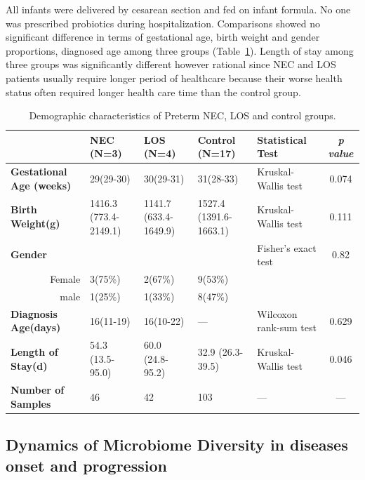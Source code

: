 \documentclass[fleqn,10pt, lineno]{wlpeerj} %
\begin{document}
  \noindent
   All infants were delivered by cesarean section and fed on infant formula. No one was prescribed probiotics during hospitalization. Comparisons showed no significant difference in terms of gestational age, birth weight and gender proportions, diagnosed age among three groups (Table~\ref{tab:demographic}). Length of stay among three groups was significantly different however rational since NEC and LOS patients usually require longer period of healthcare because their worse health status often required longer health care time than the control group.
    \begin{table}[!hpb]
       \centering
       \caption{\label{tab:demographic}Demographic characteristics of Preterm NEC, LOS and control groups.}
      \begin{tabular}{lp{1.8cm}p{1.8cm}p{1.8cm}p{2cm}c}
        \toprule
          & \textbf{NEC (N=3)} & \textbf{LOS (N=4)} & \textbf{Control (N=17)} & \textbf{Statistical Test} & \textit{p value} \\ \midrule
        \textbf{Gestational Age (weeks)} & 29(29-30) & 30(29-31) & 31(28-33) & Kruskal-Wallis test & 0.074 \\
        \textbf{Birth Weight(g)} & 1416.3 (773.4-2149.1) & 1141.7 (633.4-1649.9) & 1527.4 (1391.6-1663.1) & Kruskal-Wallis test & 0.111 \\
        \textbf{Gender} &  &  &  & Fisher's exact test & 0.82 \\
        \multicolumn{1}{r}{Female} & 3(75\%) & 2(67\%) & 9(53\%) &  & \\
        \multicolumn{1}{r}{male} & 1(25\%) & 1(33\%) & 8(47\%) &  & \\
        \textbf{Diagnosis Age(days)} & 16(11-19) & 16(10-22) & — & Wilcoxon rank-sum test & 0.629 \\
        \textbf{Length of Stay(d)} & 54.3 (13.5-95.0) & 60.0 (24.8-95.2) & 32.9 (26.3-39.5) & Kruskal-Wallis test & 0.046 \\
        \textbf{Number of Samples} & 46 & 42 & 103 & — & — \\ \bottomrule
      \end{tabular}
    \end{table}

   \subsection*{Dynamics of Microbiome Diversity in diseases onset and progression}
\end{document}
